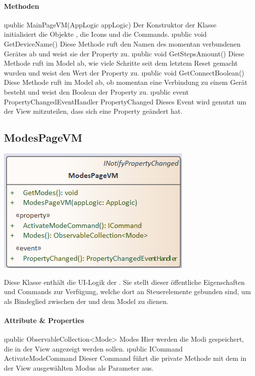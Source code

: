 \documentclass[../entwurf.tex]{subfiles}
\begin{document}
\paragraph{Methoden}
\begin{itemize}
	\i{public MainPageVM(AppLogic appLogic)} Der Konstruktor der Klasse initialisiert die Objekte , die Icons und die Commands.
	\i{public void GetDeviceName()} Diese Methode ruft den Namen des momentan verbundenen Gerätes ab und weist sie der Property  zu.
	\i{public void GetStepsAmount()} Diese Methode ruft im Model ab, wie viele Schritte seit dem letztem Reset gemacht wurden und weist den Wert der Property  zu.
	\i{public void GetConnectBoolean()} Diese Methode ruft im Model ab, ob momentan eine Verbindung zu einem Gerät besteht und weist den Boolean der Property  zu.
	\i{public event PropertyChangedEventHandler PropertyChanged} Dieses Event wird genutzt um der View mitzuteilen, dass sich eine Property geändert hat.
\end{itemize}
\subsection{ModesPageVM}
\begin{minipage}{0.55\textwidth}
\includegraphics[scale=0.75]{../graphics/vm_klassen/ModesPageVM.png}
\end{minipage}
\begin{minipage}{0.45\textwidth}
Diese Klasse enthält die UI-Logik der . Sie stellt dieser öffentliche Eigenschaften und Commands zur Verfügung, welche dort an Steuerelemente gebunden sind, um als Bindeglied zwischen der  und dem Model zu dienen.
\end{minipage}
\paragraph{Attribute \& Properties}
\begin{itemize}
	\i{public ObservableCollection<Mode> Modes} Hier werden die Modi gespeichert, die in der View angezeigt werden sollen.
	\i{public ICommand ActivateModeCommand} Dieser Command führt die private Methode  mit dem in der View ausgewählten Modus als Parameter aus. 
\end{itemize}
\end{document}
